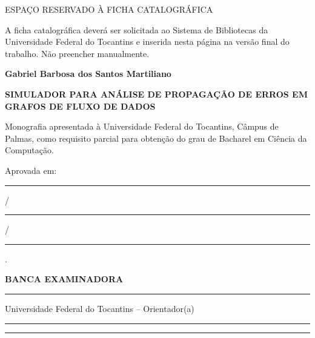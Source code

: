 \documentclass[12pt,openright,oneside,a4paper,brazil]{abntex2}
\begin{document}
\pretextual

\imprimircapa
\imprimirfolhaderosto*

\clearpage
\thispagestyle{empty}
\begin{center}
\vspace*{6cm}
{\large ESPAÇO RESERVADO À FICHA CATALOGRÁFICA}
\end{center}
\vfill
\begin{center}
A ficha catalográfica deverá ser solicitada ao Sistema de Bibliotecas da Universidade Federal do Tocantins e inserida nesta página na versão final do trabalho. Não preencher manualmente.
\end{center}
\clearpage

\clearpage
\thispagestyle{empty}
\begin{center}
{\ABNTEXchapterfont\bfseries Gabriel Barbosa dos Santos Martiliano}\par
\vspace{2cm}
{\ABNTEXchapterfont\bfseries SIMULADOR PARA ANÁLISE DE PROPAGAÇÃO DE ERROS EM GRAFOS DE FLUXO DE DADOS}\par
\end{center}
\vspace{1.5cm}
Monografia apresentada à Universidade Federal do Tocantins, Câmpus de Palmas, como requisito parcial para obtenção do grau de Bacharel em Ciência da Computação.\par
\vspace{1cm}
Aprovada em: \rule{2.5cm}{0.4pt}/\rule{2.5cm}{0.4pt}/\rule{2.5cm}{0.4pt}.\par
\vspace{2cm}
\begin{center}\textbf{BANCA EXAMINADORA}\end{center}
\vspace{1.5cm}
\noindent\rule{10cm}{0.4pt}\par
[NOME COMPLETO DO(A) ORIENTADOR(A)]\par
Universidade Federal do Tocantins -- Orientador(a)\par
\vspace{1.2cm}
\noindent\rule{10cm}{0.4pt}\par
[NOME DO(A) EXAMINADOR(A) 1]\par
[INSTITUIÇÃO]\par
\vspace{1.2cm}
\noindent\rule{10cm}{0.4pt}\par
[NOME DO(A) EXAMINADOR(A) 2]\par
[INSTITUIÇÃO]
\clearpage
\end{document}
